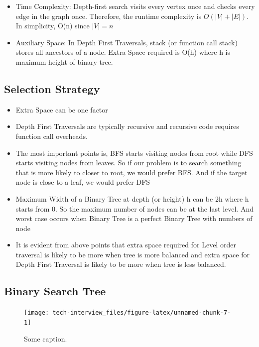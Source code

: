 \documentclass[]{book}
\providecommand{\tightlist}{%
  \setlength{\itemsep}{0pt}\setlength{\parskip}{0pt}}
\begin{document}
\begin{itemize}
\tightlist
\item
  Time Complexity: Depth-first search visits every vertex once and checks every edge in the graph once.
  Therefore, the runtime complexity is \(O(|V| + |E|)\). In simplicity, O(n) since \(|V| = n\)
\item
  Auxiliary Space: In Depth First Traversals, stack (or function call stack) stores all ancestors of a node. Extra Space required is O(h) where h is maximum height of binary tree.
\end{itemize}

\hypertarget{selection-strategy}{%
\subsection{Selection Strategy}\label{selection-strategy}}

\begin{itemize}
\tightlist
\item
  Extra Space can be one factor
\item
  Depth First Traversals are typically recursive and recursive code requires function call overheads.
\item
  The most important points is, BFS starts visiting nodes from root while DFS starts visiting nodes from leaves. So if our problem is to search something that is more likely to closer to root, we would prefer BFS. And if the target node is close to a leaf, we would prefer DFS
\item
  Maximum Width of a Binary Tree at depth (or height) h can be 2h where h starts from 0. So the maximum number of nodes can be at the last level. And worst case occurs when Binary Tree is a perfect Binary Tree with numbers of node
\item
  It is evident from above points that extra space required for Level order traversal is likely to be more when tree is more balanced and extra space for Depth First Traversal is likely to be more when tree is less balanced.
\end{itemize}

\hypertarget{binary-search-tree}{%
\subsection{Binary Search Tree}\label{binary-search-tree}}

\begin{figure}
\texttt{[image: tech-interview\_files/figure-latex/unnamed-chunk-7-1]} \caption{Some caption.}\label{fig:unnamed-chunk-7}
\end{figure}
\end{document}
